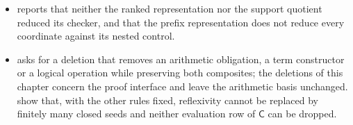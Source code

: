 \begin{itemize}
is not implemented, and the converse is the theorem
\cref{claus:thm:zero}.
\item {} reports that neither the ranked
representation nor the support quotient reduced its checker, and
 that the prefix representation does not reduce
every coordinate against its nested control.
\item {} asks for a deletion that removes an
arithmetic obligation, a term constructor or a logical operation while
preserving both composites; the deletions of this chapter concern the
proof interface and leave the arithmetic basis unchanged.
 show that, with the other rules
fixed, reflexivity cannot be replaced by finitely many closed seeds and
neither evaluation row of $\mathsf{C}$ can be dropped.
\end{itemize}
